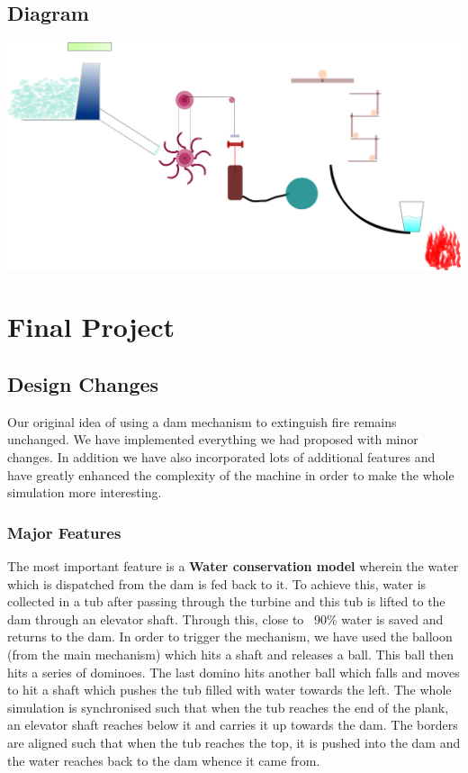 \documentclass{report}
\begin{document}
\section{Diagram}
\includegraphics[scale=0.4]{grp_30}\\

\chapter{Final Project}
\section{Design Changes}
Our original idea of using a dam mechanism to extinguish fire remains unchanged. We have implemented everything we had proposed with minor changes. In addition we have also incorporated lots of additional features and have greatly enhanced the complexity of the machine in order to make the whole simulation more interesting. 

\subsection{Major Features}
The most important feature is a \textbf{Water conservation model} wherein the water which is dispatched from the dam is fed back to it. To achieve this, water is collected in a tub after passing through the turbine and this tub is lifted to the dam through an elevator shaft. Through this, close to ~90\% water is saved and returns to the dam. In order to trigger the mechanism, we have used the balloon (from the main mechanism) which hits a shaft and releases a ball. This ball then hits a series of dominoes. The last domino hits another ball which falls and moves to hit a shaft which pushes the tub filled with water towards the left. The whole simulation is synchronised such that when the tub reaches the end of the plank, an elevator shaft reaches below it and carries it up towards the dam. The borders are aligned such that when the tub reaches the top, it is pushed into the dam and the water reaches back to the dam whence it came from.
\end{document}
